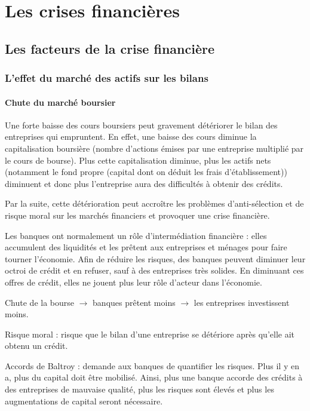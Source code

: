 \chapter{Les crises financières}

\section{Les facteurs de la crise financière}	
	
	\subsection{L'effet du marché des actifs sur les bilans}
	
		\subsubsection{Chute du marché boursier}
	
		Une forte baisse des cours boursiers peut gravement détériorer le bilan des entreprises qui empruntent. En effet, une baisse des cours diminue la capitalisation boursière (nombre d'actions émises par une entreprise multiplié par le cours de bourse). Plus cette capitalisation diminue, plus les actifs nets (notamment le fond propre (capital dont on déduit les frais d'établissement)) diminuent et donc plus l'entreprise aura des difficultés à obtenir des crédits.
	
		Par la suite, cette détérioration peut accroître les problèmes d'anti-sélection et de risque moral sur les marchés financiers et provoquer une crise financière. 
	
		Les banques ont normalement un rôle d'intermédiation financière : elles accumulent des liquidités et les prêtent aux entreprises et ménages pour faire tourner l'économie. Afin de réduire les risques, des banques peuvent diminuer leur octroi de crédit et en refuser, sauf à des entreprises très solides. En diminuant ces offres de crédit, elles ne jouent plus leur rôle d'acteur dans l'économie.
	
		Chute de la bourse $\rightarrow$ banques prêtent moins $\rightarrow$ les entreprises investissent moins.

		Risque moral : risque que le bilan d'une entreprise se détériore après qu'elle ait obtenu un crédit.
	
		Accords de Baltroy : demande aux banques de quantifier les risques. Plus il y en a, plus du capital doit être mobilisé. Ainsi, plus une banque accorde des crédits à des entreprises de mauvaise qualité, plus les risques sont élevés et plus les augmentations de capital seront nécessaire.
		
